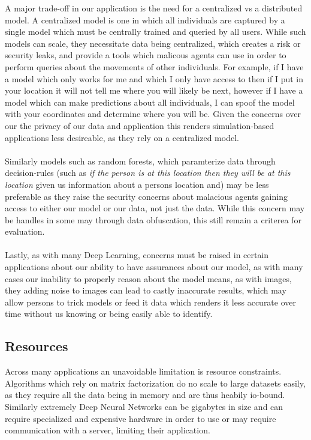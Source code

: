 \documentclass[12pt]{report}
\begin{document}
A major trade-off in our application is the need for a centralized vs a distributed model.  A centralized model is one in which all individuals are captured by a single model which must be centrally trained and queried by all users.  While such models can scale, they necessitate data being centralized, which creates a risk or security leaks, and provide a tools which malicous agents can use in order to perform queries about the movements of other individuals.  For example, if I have a model which only works for me and which I only have access to then if I put in your location it will not tell me where you will likely be next, however if I have a model which can make predictions about all individuals, I can spoof the model with your coordinates and determine where you will be.  Given the concerns over our the privacy of our data and application this renders simulation-based applications less desireable, as they rely on a centralized model.  \\
\\
Similarly models such as random forests, which paramterize data through decision-rules (such as \textit{if the person is at this location then they will be at this location} given us information about a persons location and) may be less preferable as they raise the security concerns about malacious agents gaining access to either our model or our data, not just the data.  While this concern may be handles in some may through data obfuscation, this still remain a criterea for evaluation.  \\
\\
Lastly, as with many Deep Learning, concerns must be raised in certain applications about our ability to have assurances about our model, as with many cases our inability to properly reason about the model means, as with images, they adding noise to images can lead to castly inaccurate results, which may allow persons to trick models or feed it data which renders it less accurate over time without us knowing or being easily able to identify.  \\

\subsection{Resources}
Across many applications an unavoidable limitation is resource constraints.  Algorithms which rely on matrix factorization do no scale to large datasets easily, as they require all the data being in memory and are thus heabily io-bound.  Similarly extremely Deep Neural Networks can be gigabytes in size and can require specialized and expensive hardware in order to use or may require communication with a server, limiting their application.  
\end{document}
